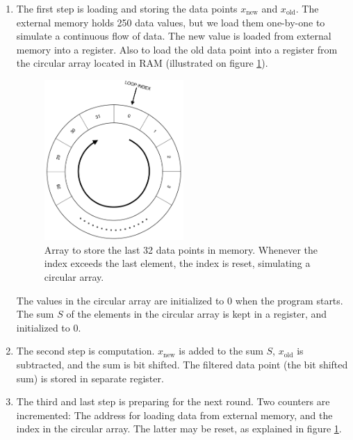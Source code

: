 \begin{enumerate}
    \item The first step is loading and storing the data points $x_{\text{new}}$ and $x_{\text{old}}$. The external memory holds 250  data values, but we load them one-by-one to simulate a continuous flow of data. The new value is loaded from external memory into a register. Also to load the old data point into a register from the circular array located in RAM (illustrated on figure \ref{fig:circarray}). 
    
    \begin{figure}[H]
        \centering
        \includegraphics[width=0.5\textwidth]{1Design/fig/Circular_Array.pdf}
        \caption{Array to store the last 32 data points in memory. Whenever the index exceeds the last element, the index is reset, simulating a circular array.}
        \label{fig:circarray}
    \end{figure}
    
    The values in the circular array are initialized to 0 when the program starts. The sum $S$ of the elements in the circular array is kept in a register, and initialized to 0.
    
    \item The second step is computation. $x_{\text{new}}$ is added to the sum $S$, $x_{\text{old}}$ is subtracted, and the sum is bit shifted. The filtered data point (the bit shifted sum) is stored in separate register.
    
    \item The third and last step is preparing for the next round. Two counters are incremented: The address for loading data from external memory, and the index in the circular array. The latter may be reset, as explained in figure \ref{fig:circarray}. 
\end{enumerate}


